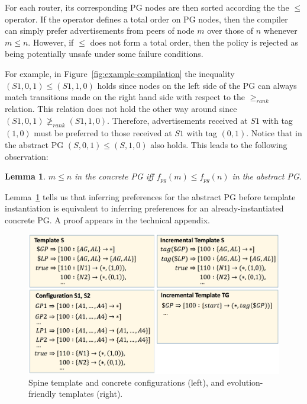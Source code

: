 \documentclass[numbers, 10pt, preprint]{sigplanconf}
\newtheorem{lem}[thm]{Lemma}
\newcommand{\Appendix}{technical appendix\xspace}
\begin{document}
For each router, its corresponding PG nodes are then sorted according the the $\leq$ operator. If the operator defines a total order on PG nodes, then the compiler can simply prefer advertisements from peers of node $m$ over those of $n$ whenever $m \leq n$. However, if $\leq$ does not form a total order, then the policy is rejected as being potentially unsafe under some failure conditions.


%
For example, in Figure~\ref{fig:example-compilation} the inequality $(S1,0,1) \leq (S1,1,0)$ holds since nodes on the left side of the PG can always match transitions made on the right hand side with respect to the $\geq_{rank}$ relation. This relation does not hold the other way around since $(S1,0,1) \ngeq_{rank} (S1,1,0)$. Therefore, advertisements received at $S1$ with tag $(1,0)$ must be preferred to those received at $S1$ with tag $(0,1)$.
%
Notice that in the abstract PG $(S,0,1) \leq (S,1,0)$ also holds. This leads to the following observation:

\begin{lem}
\label{lem:preference}
$m \leq n$ in the concrete PG iff $f_{pg}(m) \leq f_{pg}(n)$ in the abstract PG.
\end{lem}

Lemma~\ref{lem:preference} tells us that inferring preferences for the abstract PG before template instantiation is equivalent to inferring preferences for an already-instantiated concrete PG.  A proof appears in the \Appendix.


\begin{figure}[t!]
  \begin{center}
    \includegraphics[width=\columnwidth]{figures/configs}
  \end{center}
  \vspace{-1em}
  \caption{Spine template and concrete configurations (left), and evolution-friendly templates (right).}
  \label{fig:bgp-configs}
  \vspace{-.6em}
\end{figure}
\end{document}
